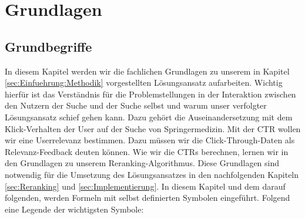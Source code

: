 %
\chapter{Grundlagen}
\label{sec:Grundlagen}


\section{Grundbegriffe}
\label{sec:Grundlagen:Grundbegriffe}

In diesem Kapitel werden wir die fachlichen Grundlagen zu unserem in Kapitel \ref{sec:Einfuehrung:Methodik} vorgestellten Lösungsansatz aufarbeiten. Wichtig hierfür ist das Verständnis für die Problemstellungen in der Interaktion zwischen den Nutzern der Suche und der Suche selbst und warum unser verfolgter Lösungsansatz schief gehen kann. Dazu gehört die Auseinandersetzung mit dem Klick-Verhalten der User auf der Suche von Springermedizin. Mit der CTR wollen wir eine Userrelevanz bestimmen. Dazu müssen wir die Click-Through-Daten als Relevanz-Feedback deuten können. Wie wir die CTRs berechnen, lernen wir in den Grundlagen zu unserem Reranking-Algorithmus. Diese Grundlagen sind notwendig für die Umsetzung des Lösungsansatzes in den nachfolgenden Kapiteln \ref{sec:Reranking} und \ref{sec:Implementierung}. In diesem Kapitel und dem darauf folgenden, werden Formeln mit selbst definierten Symbolen eingeführt. Folgend eine Legende der wichtigsten Symbole:


